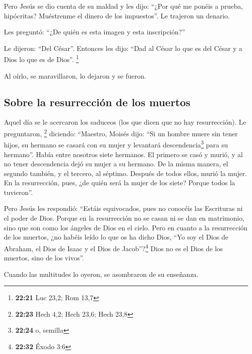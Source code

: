 \begin{paracol}{2}
 Pero Jesús se dio cuenta de su maldad y les dijo: ``¿Por
qué me ponéis a prueba, hipócritas?  Muéstrenme el dinero
de los impuestos''. Le trajeron un denario.

 Les preguntó: ``¿De quién es esta imagen y esta
inscripción?''

 Le dijeron: ``Del César''. Entonces les dijo: ``Dad al
César lo que es del César y a Dios lo que es de Dios''. \footnote{\textbf{22:21}
  Luc 23,2; Rom 13,7}

 Al oírlo, se maravillaron, lo dejaron y se fueron.

\hypertarget{sobre-la-resurrecciuxf3n-de-los-muertos}{%
\subsection{Sobre la resurrección de los
muertos}\label{sobre-la-resurrecciuxf3n-de-los-muertos}}

 Aquel día se le acercaron los saduceos (los que dicen
que no hay resurrección). Le preguntaron, \footnote{\textbf{22:23} Hech
  4,2; Hech 23,6; Hech 23,8}  diciendo: ``Maestro, Moisés
dijo: ``Si un hombre muere sin tener hijos, su hermano se casará con su
mujer y levantará descendencia\footnote{\textbf{22:24} o, semilla} para
su hermano''.  Había entre nosotros siete hermanos. El
primero se casó y murió, y al no tener descendencia dejó su mujer a su
hermano.  De la misma manera, el segundo también, y el
tercero, al séptimo.  Después de todos ellos, murió la
mujer.  En la resurrección, pues, ¿de quién será la mujer
de los siete? Porque todos la tuvieron''.

 Pero Jesús les respondió: ``Estáis equivocados, pues no
conocéis las Escrituras ni el poder de Dios.  Porque en
la resurrección no se casan ni se dan en matrimonio, sino que son como
los ángeles de Dios en el cielo.  Pero en cuanto a la
resurrección de los muertos, ¿no habéis leído lo que os ha dicho Dios,
 ``Yo soy el Dios de Abraham, el Dios de Isaac y el Dios
de Jacob''?\footnote{\textbf{22:32} Éxodo 3:6} Dios no es el Dios de los
muertos, sino de los vivos''.

 Cuando las multitudes lo oyeron, se asombraron de su
enseñanza.

\hypertarget{la-pregunta-de-un-intuxe9rprete-de-la-ley-sobre-el-mandamiento-muxe1s-noble}{%
}
\end{paracol}
